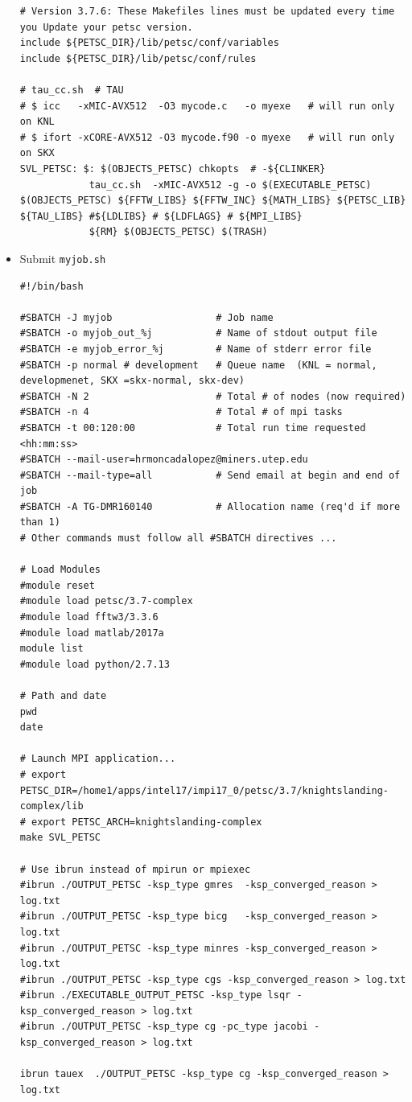 \documentclass{article}
\begin{document}
\begin{itemize}
\begin{verbatim}
# Version 3.7.6: These Makefiles lines must be updated every time you Update your petsc version.
include ${PETSC_DIR}/lib/petsc/conf/variables
include ${PETSC_DIR}/lib/petsc/conf/rules

# tau_cc.sh  # TAU
# $ icc   -xMIC-AVX512  -O3 mycode.c   -o myexe   # will run only on KNL
# $ ifort -xCORE-AVX512 -O3 mycode.f90 -o myexe   # will run only on SKX
SVL_PETSC: $: $(OBJECTS_PETSC) chkopts  # -${CLINKER}
            tau_cc.sh  -xMIC-AVX512 -g -o $(EXECUTABLE_PETSC) $(OBJECTS_PETSC) ${FFTW_LIBS} ${FFTW_INC} ${MATH_LIBS} ${PETSC_LIB} ${TAU_LIBS} #${LDLIBS} # ${LDFLAGS} # ${MPI_LIBS} 
            ${RM} $(OBJECTS_PETSC) $(TRASH)                                                             
\end{verbatim}
\normalsize
\item Submit \verb+myjob.sh+
 \scriptsize
\begin{verbatim}
#!/bin/bash

#SBATCH -J myjob                  # Job name
#SBATCH -o myjob_out_%j           # Name of stdout output file
#SBATCH -e myjob_error_%j         # Name of stderr error file
#SBATCH -p normal # development   # Queue name  (KNL = normal, developmenet, SKX =skx-normal, skx-dev)
#SBATCH -N 2                      # Total # of nodes (now required)
#SBATCH -n 4                      # Total # of mpi tasks
#SBATCH -t 00:120:00              # Total run time requested <hh:mm:ss>
#SBATCH --mail-user=hrmoncadalopez@miners.utep.edu
#SBATCH --mail-type=all           # Send email at begin and end of job
#SBATCH -A TG-DMR160140           # Allocation name (req'd if more than 1)
# Other commands must follow all #SBATCH directives ...

# Load Modules
#module reset
#module load petsc/3.7-complex
#module load fftw3/3.3.6
#module load matlab/2017a 
module list
#module load python/2.7.13

# Path and date 
pwd
date

# Launch MPI application...
# export PETSC_DIR=/home1/apps/intel17/impi17_0/petsc/3.7/knightslanding-complex/lib
# export PETSC_ARCH=knightslanding-complex
make SVL_PETSC

# Use ibrun instead of mpirun or mpiexec
#ibrun ./OUTPUT_PETSC -ksp_type gmres  -ksp_converged_reason > log.txt
#ibrun ./OUTPUT_PETSC -ksp_type bicg   -ksp_converged_reason > log.txt
#ibrun ./OUTPUT_PETSC -ksp_type minres -ksp_converged_reason > log.txt
#ibrun ./OUTPUT_PETSC -ksp_type cgs -ksp_converged_reason > log.txt
#ibrun ./EXECUTABLE_OUTPUT_PETSC -ksp_type lsqr -ksp_converged_reason > log.txt
#ibrun ./OUTPUT_PETSC -ksp_type cg -pc_type jacobi -ksp_converged_reason > log.txt

ibrun tauex  ./OUTPUT_PETSC -ksp_type cg -ksp_converged_reason > log.txt                                                        
\end{verbatim}
\normalsize
\end{itemize}
\end{document}
